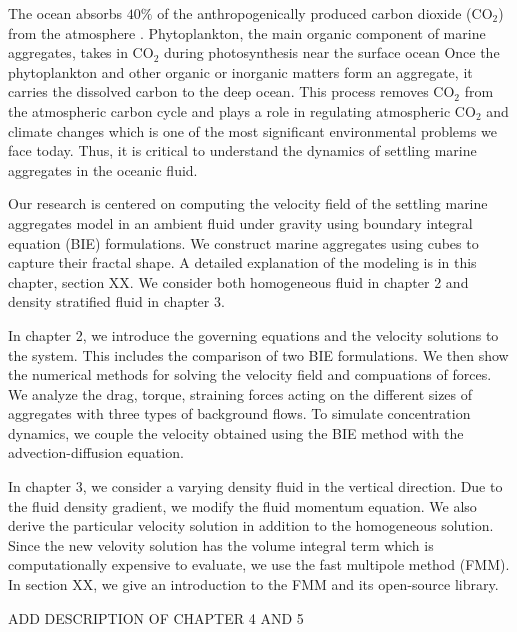 The ocean absorbs $40 \%$ of the anthropogenically produced carbon dioxide (CO$_2$) from the atmosphere \cite{omand_sinking_2020}. 
 Phytoplankton, the main organic component of marine aggregates, takes in CO$_2$ during photosynthesis near the surface ocean
Once the phytoplankton and other organic or inorganic matters form an aggregate, it carries the dissolved carbon to the deep ocean. This process removes CO$_2$ from the atmospheric carbon cycle \cite{burd_particle_2009} and plays a role in regulating atmospheric CO$_2$ and climate changes which is one of the most significant environmental problems we face today. 
 Thus, it is critical to understand the dynamics of settling marine aggregates in the oceanic fluid.
\par
Our research is centered on computing the velocity field of the settling marine aggregates model in an ambient fluid under gravity using boundary integral equation (BIE) formulations. We construct marine aggregates using cubes to capture their fractal shape. A detailed explanation of the modeling is in this chapter, section XX. We consider both homogeneous fluid in chapter 2 and density stratified fluid in chapter 3. 
\par
In chapter 2, we introduce the governing equations and the velocity solutions to the system. This includes the comparison of two BIE formulations. We then show the numerical methods for solving the velocity field and compuations of forces. We analyze the drag, torque, straining forces acting on the different sizes of aggregates with three types of background flows.
 To simulate concentration dynamics, we couple the velocity obtained using the BIE method with the advection-diffusion equation.
\par
In chapter 3, we consider a varying density fluid in the vertical direction. Due to the fluid density gradient, we modify the fluid momentum equation. We also derive the particular velocity solution in addition to the homogeneous solution. Since the new velovity solution has the volume integral term which is computationally expensive to evaluate, we use the fast multipole method (FMM). In section XX, we give an introduction to the FMM and its open-source library. 
\par
{\color{blue} ADD DESCRIPTION OF CHAPTER 4 AND 5}


